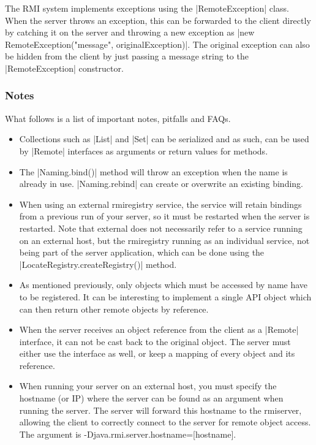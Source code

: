 \documentclass[a4paper]{article}
\begin{document}
The RMI system implements exceptions using the |RemoteException| class. When the server throws an exception, this can be forwarded to the client directly by catching it on the server and throwing a new exception as |new RemoteException("message", originalException)|. The original exception can also be hidden from the client by just passing a message string to the |RemoteException| constructor.

\subsubsection{Notes}

What follows is a list of important notes, pitfalls and FAQs.

\begin{itemize}
\item Collections such as |List| and |Set| can be serialized and as such, can be used by |Remote| interfaces as arguments or return values for methods.
\item The |Naming.bind()| method will throw an exception when the name is already in use. |Naming.rebind| can create or overwrite an existing binding.
\item When using an external rmiregistry service, the service will retain bindings from a previous run of your server, so it must be restarted when the server is restarted. Note that external does not necessarily refer to a service running on an external host, but the rmiregistry running as an individual service, not being part of the server application, which can be done using the |LocateRegistry.createRegistry()| method.
\item As mentioned previously, only objects which must be accessed by name have to be registered. It can be interesting to implement a single API object which can then return other remote objects by reference.
\item When the server receives an object reference from the client as a |Remote| interface, it can not be cast back to the original object. The server must either use the interface as well, or keep a mapping of every object and its reference.
\item When running your server on an external host, you must specify the hostname (or IP) where the server can be found as an argument when running the server. The server will forward this hostname to the rmiserver, allowing the client to correctly connect to the server for remote object access. The argument is {\small\ttfamily -Djava.rmi.server.hostname=[hostname]}.
\end{itemize}
\end{document}
